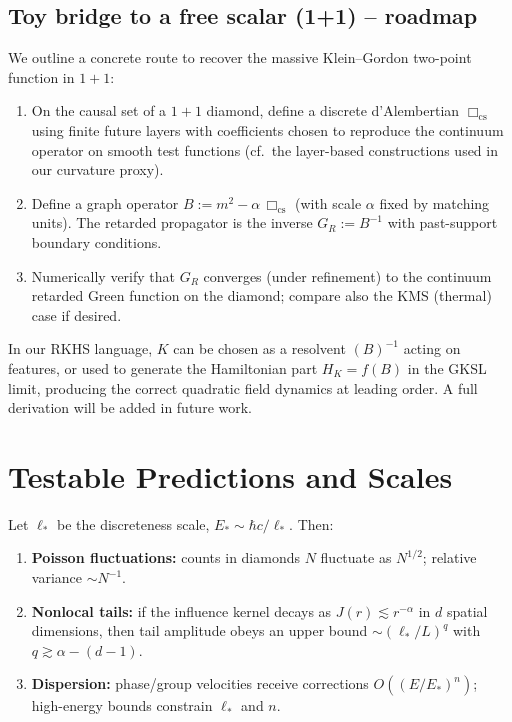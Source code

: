 \documentclass[12pt,a4paper]{article}
\begin{document}
\subsection{Toy bridge to a free scalar (1+1) -- roadmap}\label{subsec:toy_scalar}
We outline a concrete route to recover the massive Klein--Gordon two-point function in $1{+}1$:
\begin{enumerate}
\item On the causal set of a $1{+}1$ diamond, define a discrete d'Alembertian $\Box_{\mathrm{cs}}$ using finite future layers with coefficients chosen to reproduce the continuum operator on smooth test functions (cf.\ the layer-based constructions used in our curvature proxy).
\item Define a graph operator $B:=m^2 - \alpha\,\Box_{\mathrm{cs}}$ (with scale $\alpha$ fixed by matching units). The retarded propagator is the inverse $G_R:=B^{-1}$ with past-support boundary conditions.
\item Numerically verify that $G_R$ converges (under refinement) to the continuum retarded Green function on the diamond; compare also the KMS (thermal) case if desired.
\end{enumerate}
In our RKHS language, $K$ can be chosen as a resolvent $(B)^{-1}$ acting on features, or used to generate the Hamiltonian part $H_K=f(B)$ in the GKSL limit, producing the correct quadratic field dynamics at leading order. A full derivation will be added in future work.
\section{Testable Predictions and Scales}



Let $\ell_*$ be the discreteness scale, $E_* \sim \hbar c/\ell_*$. Then:
\begin{enumerate}
\item \textbf{Poisson fluctuations:} counts in diamonds $N$ fluctuate as $N^{1/2}$; relative variance $\sim N^{-1}$.
\item \textbf{Nonlocal tails:} if the influence kernel decays as $J(r)\lesssim r^{-\alpha}$ in $d$ spatial dimensions, then tail amplitude obeys an upper bound $\sim (\ell_*/L)^q$ with $q \gtrsim \alpha-(d-1)$.
\item \textbf{Dispersion:} phase/group velocities receive corrections $O((E/E_*)^n)$; high-energy bounds constrain $\ell_*$ and $n$.
\end{enumerate}
\end{document}
